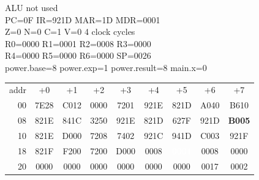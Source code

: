 \begin{tcolorbox}[stepbox, title={Step 19 \hfill PC 0E \quad ST R1, power.exp}]
\textcolor{dim}{ALU} \textcolor{dim}{not used}\\
PC=0F IR=921D MAR=1D MDR=0001\\
Z=0 N=0 C=1 V=0 \hfill \textcolor{dim}{4 clock cycles}\\
R0=0000 R1=0001 R2=0008 R3=0000\\
R4=0000 R5=0000 R6=0000 SP=0026\\
\textcolor{dim}{power.base=8  power.exp=1  power.result=8  main.x=0}\\[1pt]
{\setlength{\tabcolsep}{1.6pt}\begin{tabular}{@{}r*{8}{c}@{}}
\textcolor{dim}{addr} & \textcolor{dim}{+0} & \textcolor{dim}{+1} & \textcolor{dim}{+2} & \textcolor{dim}{+3} & \textcolor{dim}{+4} & \textcolor{dim}{+5} & \textcolor{dim}{+6} & \textcolor{dim}{+7}\\
\textcolor{dim}{00} & 7E28 & C012 & 0000 & 7201 & 921E & 821D & A040 & B610\\
\textcolor{dim}{08} & 821E & 841C & 3250 & 921E & 821D & 627F & 921D & \cellcolor{pcc}\textbf{B005}\\
\textcolor{dim}{10} & 821E & D000 & 7208 & 7402 & 921C & 941D & C003 & 921F\\
\textcolor{dim}{18} & 821F & F200 & 7200 & D000 & \cellcolor{datac}0008 & \cellcolor{wrt}\textcolor{white}{\textbf{0001}} & \cellcolor{datac}0008 & \cellcolor{datac}0000\\
\textcolor{dim}{20} & \cellcolor{stackc}0000 & \cellcolor{stackc}0000 & \cellcolor{stackc}0000 & \cellcolor{stackc}0000 & \cellcolor{stackc}0000 & \cellcolor{stackc}0000 & \cellcolor{stackc}0017 & \cellcolor{stackc}0002\\
\end{tabular}}
\end{tcolorbox}\par\vspace{3pt}
